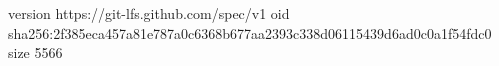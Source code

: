 version https://git-lfs.github.com/spec/v1
oid sha256:2f385eca457a81e787a0c6368b677aa2393c338d06115439d6ad0c0a1f54fdc0
size 5566

